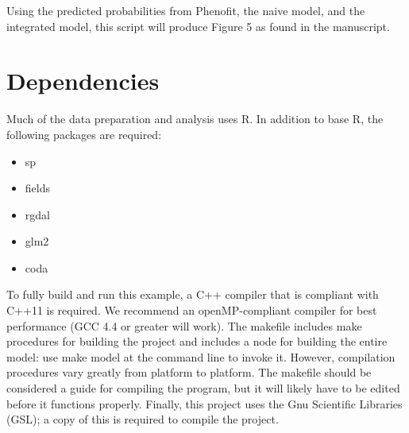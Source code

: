 \documentclass[11pt]{article}
\newcommand{\code}[1]{\colorbox{light-gray}{\ttfamily #1}}
\begin{document}
Using the predicted probabilities from Phenofit, the naive model, and the integrated model, this script will produce Figure 5 as found in the manuscript.


\section{Dependencies}
Much of the data preparation and analysis uses R. In addition to base R, the following packages are required:
\begin{itemize}
	\item sp
	\item fields
	\item rgdal
	\item glm2
	\item coda
\end{itemize}

To fully build and run this example, a C++ compiler that is compliant with C++11 is required. 
We recommend an openMP-compliant compiler for best performance (GCC 4.4 or greater will work).
The makefile includes make procedures for building the project and includes a node for building the entire model: use \code{make model} at the command line to invoke it.
However, compilation procedures vary greatly from platform to platform.
The makefile should be considered a guide for compiling the program, but it will likely have to be edited before it functions properly.
Finally, this project uses the Gnu Scientific Libraries (GSL); a copy of this is required to compile the project.
\end{document}
